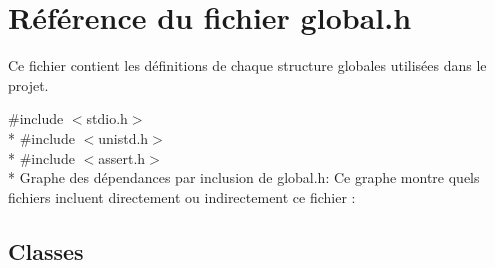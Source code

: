 \hypertarget{a00022}{}\section{Référence du fichier global.\+h}
\label{a00022}


Ce fichier contient les définitions de chaque structure globales utilisées dans le projet.  


{\ttfamily \#include $<$stdio.\+h$>$}\\*
{\ttfamily \#include $<$unistd.\+h$>$}\\*
{\ttfamily \#include $<$assert.\+h$>$}\\*
Graphe des dépendances par inclusion de global.\+h\+:
Ce graphe montre quels fichiers incluent directement ou indirectement ce fichier \+:
\subsection*{Classes}
